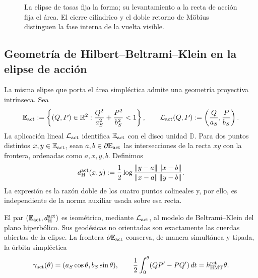\begin{figure}[htbp]
\centering
\resizebox{.98\textwidth}{!}{}
\caption{La elipse de tasas fija la forma; su levantamiento a la recta de acción fija
el área. El cierre cilíndrico y el doble retorno de Möbius distinguen la fase
interna de la vuelta visible.}
\label{fig:elipse-accion-holonomia-rev8}
\end{figure}

\subsection{Geometría de Hilbert--Beltrami--Klein en la elipse de acción}
\label{sec:hilbert-beltrami-klein-elipse-accion}

La misma elipse que porta el área simpléctica admite una geometría proyectiva
intrínseca. Sea
\[
 \mathbb E_{\rm act}
 :=\left\{(Q,P)\in\mathbb R^2:
 \frac{Q^2}{a_S^2}+\frac{P^2}{b_S^2}<1\right\},
 \qquad
 \mathcal L_{\rm act}(Q,P)
 :=\left(\frac{Q}{a_S},\frac{P}{b_S}\right).
\]
La aplicación lineal \(\mathcal L_{\rm act}\) identifica
\(\mathbb E_{\rm act}\) con el disco unidad \(\mathbb D\). Para dos puntos
distintos \(x,y\in\mathbb E_{\rm act}\), sean \(a,b\in\partial
\mathbb E_{\rm act}\) las intersecciones de la recta \(xy\) con la frontera,
ordenadas como \(a,x,y,b\). Definimos
\begin{equation}
 d_{\rm H}^{\rm act}(x,y)
 :=\frac12\log
 \frac{\lVert y-a\rVert\,\lVert x-b\rVert}
      {\lVert x-a\rVert\,\lVert y-b\rVert}.
 \label{eq:distancia-hilbert-elipse-accion}
\end{equation}
La expresión es la razón doble de los cuatro puntos colineales y, por ello,
es independiente de la norma auxiliar usada sobre esa recta.

\begin{proposition}
\label{prop:beltrami-klein-elipse-accion}
El par \((\mathbb E_{\rm act},d_{\rm H}^{\rm act})\) es isométrico, mediante
\(\mathcal L_{\rm act}\), al modelo de Beltrami--Klein del plano hiperbólico.
Sus geodésicas no orientadas son exactamente las cuerdas abiertas de la
elipse. La frontera \(\partial\mathbb E_{\rm act}\) conserva, de manera
simultánea y tipada, la órbita simpléctica
\[
 \gamma_{\rm act}(\theta)
 =(a_S\cos\theta,b_S\sin\theta),
 \qquad
 \frac12\int_0^\theta(QP'-PQ')\,dt
 =\hbar_{\rm HMT}^{\rm ret}\theta.
\]
\end{proposition}


